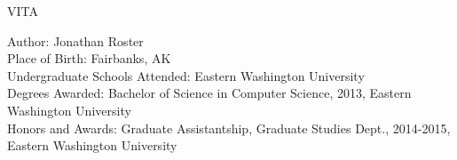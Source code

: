 \vspace*{1.5in}
\doublespace
\begin{center}
VITA
\end{center}
Author: Jonathan Roster\\
Place of Birth: Fairbanks, AK \\
Undergraduate Schools Attended: Eastern Washington University \\
Degrees Awarded: Bachelor of Science in Computer Science, 2013, Eastern Washington University \\
Honors and Awards: Graduate Assistantship, Graduate Studies Dept., 2014-2015, Eastern Washington University \\